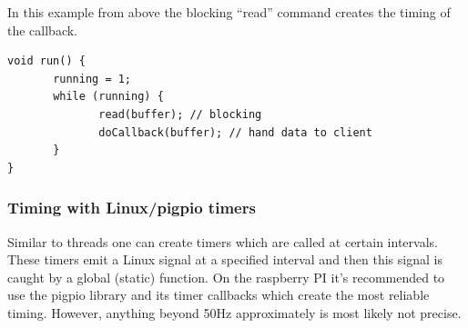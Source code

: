 \documentclass[12pt]{report}
\begin{document}
In this example from above the blocking ``read'' command creates
the timing of the callback.
\begin{verbatim}
void run() {
       running = 1;
       while (running) {
              read(buffer); // blocking
              doCallback(buffer); // hand data to client
       }
}
\end{verbatim}


\subsubsection{Timing with Linux/pigpio timers}
Similar to threads one can create timers which are called at certain
intervals. These timers emit a Linux signal at a specified interval
and then this signal is caught by a global (static) function.
On the raspberry PI it's recommended to use the pigpio library
and its timer callbacks which create the most reliable timing.
However, anything beyond 50Hz approximately is most likely not
precise.
\end{document}

